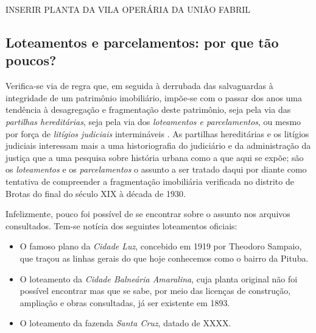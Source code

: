 INSERIR PLANTA DA VILA OPERÁRIA DA UNIÃO FABRIL

\subsection{Loteamentos e parcelamentos: por que tão poucos?}\label{subsec:loteamentos}

Verifica-se via de regra que, em seguida à derrubada das salvaguardas à integridade de um patrimônio imobiliário, impõe-se com o passar dos anos uma tendência à desagregação e fragmentação deste patrimônio, seja pela via das \textit{partilhas hereditárias}, seja pela via dos \textit{loteamentos e parcelamentos}, ou mesmo por força de \textit{litígios judiciais} intermináveis \cite{costaporto_sesmaria_1980,sodero_diragrario_1990}. As partilhas hereditárias e os litígios judiciais interessam mais a uma historiografia do judiciário e da administração da justiça que a uma pesquisa sobre história urbana como a que aqui se expõe; são os \textit{loteamentos} e os \textit{parcelamentos} o assunto a ser tratado daqui por diante como tentativa de compreender a fragmentação imobiliária verificada no distrito de Brotas do final do século XIX à década de 1930.

Infelizmente, pouco foi possível de se encontrar sobre o assunto nos arquivos consultados. Tem-se notícia dos seguintes loteamentos oficiais:

\begin{itemize}
\item O famoso plano da \textit{Cidade Luz}, concebido em 1919 por Theodoro Sampaio, que traçou as linhas gerais do que hoje conhecemos como o bairro da Pituba.
\item O loteamento da \textit{Cidade Balneária Amaralina}, cuja planta original não foi possível encontrar mas que se sabe, por meio das licenças de construção, ampliação e obras consultadas, já ser existente em 1893.
\item O loteamento da fazenda \textit{Santa Cruz}, datado de XXXX.
\end{itemize} 


